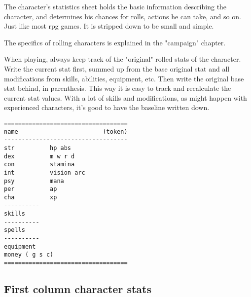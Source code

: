The character's statistics sheet holds the basic information describing the character, and determines his chances for rolls, actions he can take, and so on. Just like most rpg games. It is stripped down to be small and simple.

The specifics of rolling characters is explained in the "campaign" chapter.

When playing, always keep track of the "original" rolled stats of the character. Write the current stat first, summed up from the base original stat and all modifications from skills, abilities, equipment, etc. Then write the original base stat behind, in parenthesis. This way it is easy to track and recalculate the current stat values. With a lot of skills and modifications, as might happen with experienced characters, it's good to have the baseline written down.

\goodbreak
\begin{samepage} \begin{verbatim}
===================================
name                        (token)
-----------------------------------
str          hp abs
dex          m w r d
con          stamina
int          vision arc
psy          mana
per          ap
cha          xp
----------
skills
----------
spells
----------
equipment
money ( g s c)
===================================
\end{verbatim} \end{samepage}


\subsection*{First column character stats}


